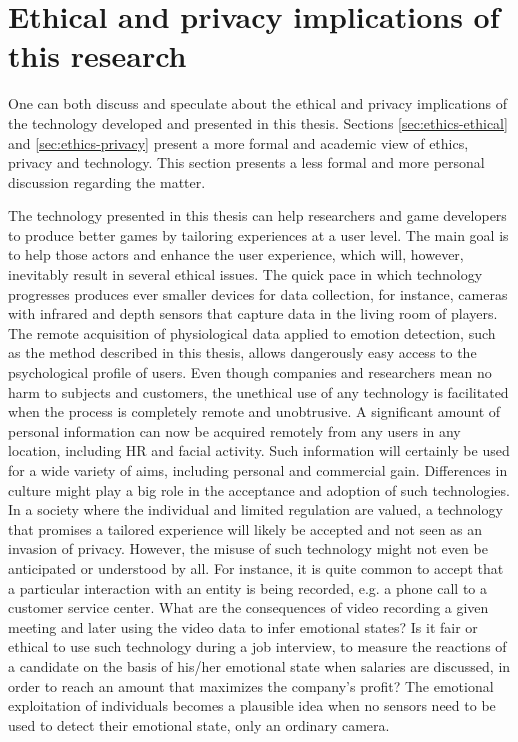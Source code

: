\section{Ethical and privacy implications of this research}
\label{sec:ethics-implications}

One can both discuss and speculate about the ethical and privacy implications of the technology developed and presented in this thesis. Sections \ref{sec:ethics-ethical} and \ref{sec:ethics-privacy} present a more formal and academic view of ethics, privacy and technology. This section presents a less formal and more personal discussion regarding the matter.

The technology presented in this thesis can help researchers and game developers to produce better games by tailoring experiences at a user level. The main goal is to help those actors and enhance the user experience, which will, however, inevitably result in several ethical issues. The quick pace in which technology progresses produces ever smaller devices for data collection, for instance, cameras with infrared and depth sensors that capture data in the living room of players. The remote acquisition of physiological data applied to emotion detection, such as the method described in this thesis, allows dangerously easy access to the psychological profile of users. Even though companies and researchers mean no harm to subjects and customers, the unethical use of any technology is facilitated when the process is completely remote and unobtrusive. A significant amount of personal information can now be acquired remotely from any users in any location, including HR and facial activity. Such information will certainly be used for a wide variety of aims, including personal and commercial gain. Differences in culture might play a big role in the acceptance and adoption of such technologies. In a society where the individual and limited regulation are valued, a technology that promises a tailored experience will likely be accepted and not seen as an invasion of privacy. However, the misuse of such technology might not even be anticipated or understood by all. For instance, it is quite common to accept that a particular interaction with an entity is being recorded, e.g. a phone call to a customer service center. What are the consequences of video recording a given meeting and later using the video data to infer emotional states? Is it fair or ethical to use such technology during a job interview, to measure the reactions of a candidate on the basis of his/her emotional state when salaries are discussed, in order to reach an amount that maximizes the company's profit? The emotional exploitation of individuals becomes a plausible idea when no sensors need to be used to detect their emotional state, only an ordinary camera.

